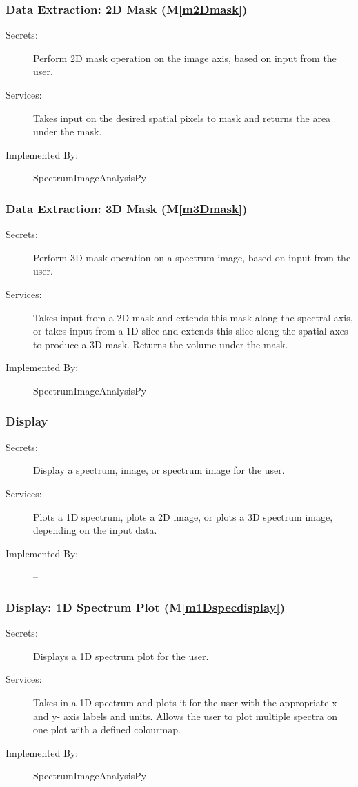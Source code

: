 \documentclass[12pt, titlepage]{article}
\newcommand{\mref}[1]{M\ref{#1}}
\newcommand{\progname}{SpectrumImageAnalysisPy}
\begin{document}
\subsubsection{Data Extraction: 2D Mask (\mref{m2Dmask})}
\begin{description}
	\item[Secrets:]Perform 2D mask operation on the image axis, based on input from
the user.
	\item[Services:]Takes input on the desired spatial pixels to mask and returns
the area under the mask.
	\item[Implemented By:] \progname
\end{description}

\subsubsection{Data Extraction: 3D Mask (\mref{m3Dmask})}
\begin{description}
	\item[Secrets:]Perform 3D mask operation on a spectrum image, based on input
from the user.
	\item[Services:]Takes input from a 2D mask and extends this mask along the
spectral axis, or takes input from a 1D slice and extends this slice along the
spatial axes to produce a 3D mask. Returns the volume under the mask.
	\item[Implemented By:] \progname
\end{description}

\subsubsection{Display}
\begin{description}
	\item[Secrets:]Display a spectrum, image, or spectrum image for the user.
	\item[Services:]Plots a 1D spectrum, plots a 2D image, or plots a 3D spectrum
image, depending on the input data. 
	\item[Implemented By:] --
\end{description}

\subsubsection{Display: 1D Spectrum Plot (\mref{m1Dspecdisplay})}
\begin{description}
	\item[Secrets:]Displays a 1D spectrum plot for the user.
	\item[Services:]Takes in a 1D spectrum and plots it for the user with the
appropriate x- and y- axis labels and units. Allows the user to plot multiple
spectra on one plot with a defined colourmap.
	\item[Implemented By:] \progname
\end{description}
\end{document}
